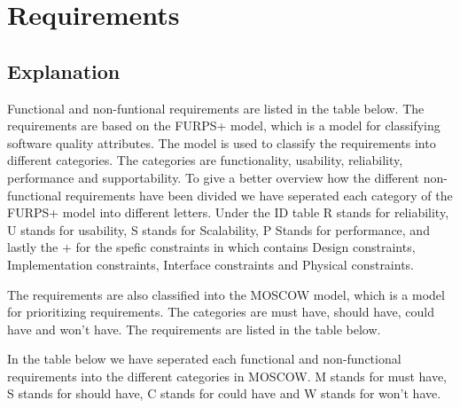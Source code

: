 
\section{Requirements}


\subsection{Explanation}
Functional and non-funtional requirements are listed in the table below. The requirements are based on the FURPS+ model, which is a model for classifying software quality attributes. The model is used to classify the requirements into different categories. The categories are functionality, usability, reliability, performance and supportability.
To give a better overview how the different non-functional requirements have been divided we have seperated each category of the FURPS+ model into different letters. Under the ID table R stands for reliability, U stands for usability, S stands for Scalability, P Stands for performance, and lastly the + for the spefic constraints in which contains Design constraints, Implementation constraints, Interface constraints and Physical constraints. \newline

The requirements are also classified into the MOSCOW model, which is a model for prioritizing requirements. The categories are must have, should have, could have and won't have. The requirements are listed in the table below. \newline

In the table below we have seperated each functional and non-functional requirements into the different categories in MOSCOW. M stands for must have, S stands for should have, C stands for could have and W stands for won't have.\cite{example} \newline

